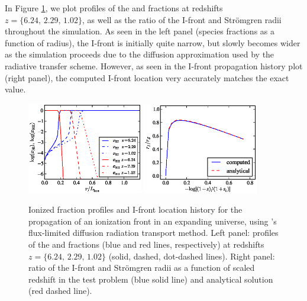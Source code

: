 In Figure \ref{fig.fld}, we plot profiles of the  and
 fractions at redshifts $z=\{6.24,\, 2.29,\, 1.02\}$, as
well as the ratio of the I-front and Str{\" o}mgren radii throughout
the simulation.  As seen in the left panel (species fractions as a
function of radius), the I-front is initially quite narrow, but slowly
becomes wider as the simulation proceeds due to the diffusion
approximation used by the radiative transfer scheme.  However, as seen
in the I-front propagation history plot (right panel), the computed
I-front location very accurately matches the exact value.

\begin{figure}
\begin{center}
\includegraphics[width=0.45\textwidth]{figures/FLDprofiles.eps}
\includegraphics[width=0.45\textwidth]{figures/FLDhistory.eps}
\caption{Ionized fraction profiles and I-front location history for
the propagation of an ionization front in an expanding universe, using
\enzo's flux-limited diffusion radiation transport method.  Left
panel: profiles of the  and  fractions (blue and
red lines, respectively) at redshifts $z=\{6.24,\, 2.29,\, 1.02\}$
(solid, dashed, dot-dashed lines).  Right panel: ratio of the I-front
and Str{\" o}mgren radii as a function of scaled redshift in the test
problem (blue solid line) and analytical solution (red dashed line).}
\label{fig.fld}
\end{center}
\end{figure}

